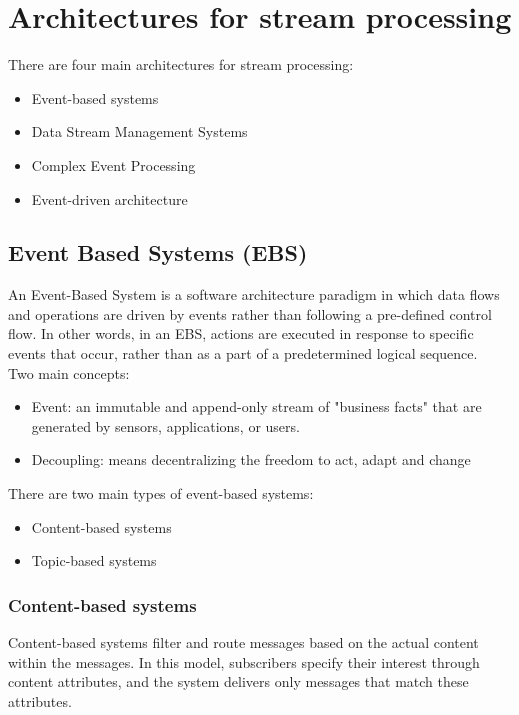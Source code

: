 \section{Architectures for stream processing}

There are four main architectures for stream processing:

\begin{itemize}
    \item Event-based systems
    \item Data Stream Management Systems
    \item Complex Event Processing
    \item Event-driven architecture
\end{itemize}


\subsection{Event Based Systems (EBS)}

An Event-Based System is a software architecture paradigm in which data flows
and operations are driven by events rather than following a pre-defined control
flow. In other words, in an EBS, actions are executed in response to specific events
that occur, rather than as a part of a predetermined logical sequence.\\

Two main concepts:

\begin{itemize}
    \item Event: an immutable and append-only stream of "business facts" that are
    generated by sensors, applications, or users.
    \item Decoupling: means decentralizing the freedom to act, adapt and change
\end{itemize}

There are two main types of event-based systems:

\begin{itemize}
    \item Content-based systems
    \item Topic-based systems
\end{itemize}

\subsubsection{Content-based systems}

Content-based systems filter and route messages based on the actual content within
the messages. In this model, subscribers specify their interest through content attributes,
and the system delivers only messages that match these attributes.\\

